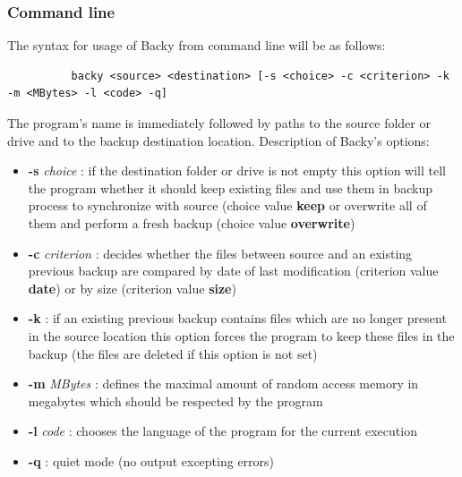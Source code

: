 \documentclass[a4paper]{article}
\begin{document}
      \subsubsection{Command line}
        The syntax for usage of Backy from command line will be as follows:
        \begin{lstlisting}
          backy <source> <destination> [-s <choice> -c <criterion> -k -m <MBytes> -l <code> -q] 
        \end{lstlisting}
        The program's name is immediately followed by paths to the source folder or drive and to the backup destination location.
        Description of Backy's options:
        \begin{itemize}
          \item \textbf{-s} \textit{choice} : if the destination folder or drive is not empty this option will tell the program whether it should keep existing files and use them in backup process to synchronize with source (choice value \textbf{keep} or overwrite all of them and perform a fresh backup (choice value \textbf{overwrite})
          \item \textbf{-c} \textit{criterion} : decides whether the files between source and an existing previous backup are compared by date of last modification (criterion value \textbf{date}) or by size (criterion value \textbf{size})
          \item \textbf{-k} : if an existing previous backup contains files which are no longer present in the source location this option forces the program to keep these files in the backup (the files are deleted if this option is not set)
          \item \textbf{-m} \textit{MBytes} : defines the maximal amount of random access memory in megabytes which should be respected by the program
          \item \textbf{-l} \textit{code} : chooses the language of the program for the current execution
          \item \textbf{-q} : quiet mode (no output excepting errors)
        \end{itemize}
\end{document}
